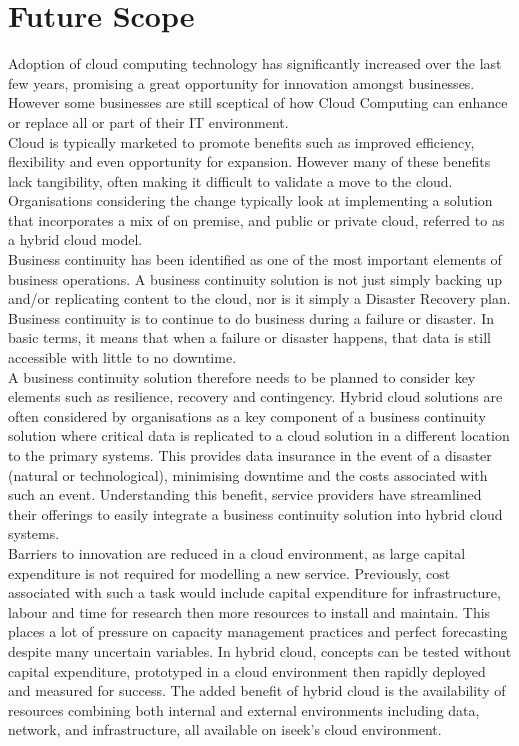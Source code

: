\documentclass[a4paper,12pt]{report}
\begin{document}
\chapter{Future Scope}
Adoption of cloud computing technology has significantly increased over the last few years, promising a great opportunity for innovation amongst businesses. However some businesses are still sceptical of how Cloud Computing can enhance or replace all or part of their IT environment.\\
\newline
Cloud is typically marketed to promote benefits such as improved efficiency, flexibility and even opportunity for expansion. However many of these benefits lack tangibility, often making it difficult to validate a move to the cloud.\\
\newline
Organisations considering the change typically look at implementing a solution that incorporates a mix of on premise, and public or private cloud, referred to as a hybrid cloud model.\\
\newline
Business continuity has been identified as one of the most important elements of business operations. A business continuity solution is not just simply backing up and/or replicating content to the cloud, nor is it simply a Disaster Recovery plan. Business continuity is to continue to do business during a failure or disaster. In basic terms, it means that when a failure or disaster happens, that data is still accessible with little to no downtime.\\
\newline
A business continuity solution therefore needs to be planned to consider key elements such as resilience, recovery and contingency. Hybrid cloud solutions are often considered by organisations as a key component of a business continuity solution where critical data is replicated to a cloud solution in a different location to the primary systems. This provides data insurance in the event of a disaster (natural or technological), minimising downtime and the costs associated with such an event. Understanding this benefit, service providers have streamlined their offerings to easily integrate a business continuity solution into hybrid cloud systems.\\
\newline
Barriers to innovation are reduced in a cloud environment, as large capital expenditure is not required for modelling a new service. Previously, cost associated with such a task would include capital expenditure for infrastructure, labour and time for research then more resources to install and maintain. This places a lot of pressure on capacity management practices and perfect forecasting despite many uncertain variables. In hybrid cloud, concepts can be tested without capital expenditure, prototyped in a cloud environment then rapidly deployed and measured for success. The added benefit of hybrid cloud is the availability of resources combining both internal and external environments including data, network, and infrastructure, all available on iseek’s cloud environment.\\
\end{document}
